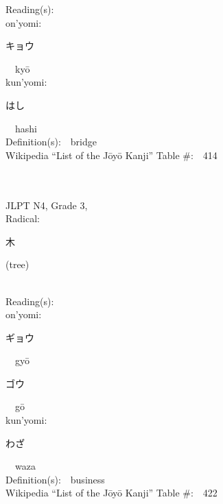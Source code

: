 \begin{multicols}{2}
Reading(s):\ \ \\
{\hspace*{1em}}on'yomi:\ \ \\
{\hspace*{2em}}{\begin{CJK}{UTF8}{min} キョウ \end{CJK}}\ \ ky\=o\ \ \\
{\hspace*{1em}}kun'yomi:\ \ \\
{\hspace*{2em}}{\begin{CJK}{UTF8}{min} はし \end{CJK}}\ \ hashi\ \ \\
Definition(s):\ \ bridge \\
Wikipedia ``List of the J\=oy\=o Kanji'' Table \#:\ \ 414 \\
\ \ \\
{\fontsize{34pt}{40pt}  }\ \ \\  %
{JLPT N4, Grade 3, \\Radical:\ \ {\begin{CJK}{UTF8}{min} 木 \end{CJK}} (tree) } \\
Reading(s):\ \ \\
{\hspace*{1em}}on'yomi:\ \ \\
{\hspace*{2em}}{\begin{CJK}{UTF8}{min} ギョウ \end{CJK}}\ \ gy\=o\ \ \\
{\hspace*{2em}}{\begin{CJK}{UTF8}{min} ゴウ \end{CJK}}\ \ g\=o\ \ \\
{\hspace*{1em}}kun'yomi:\ \ \\
{\hspace*{2em}}{\begin{CJK}{UTF8}{min} わざ \end{CJK}}\ \ waza\ \ \\
Definition(s):\ \ business \\
Wikipedia ``List of the J\=oy\=o Kanji'' Table \#:\ \ 422 \\

\end{multicols}

